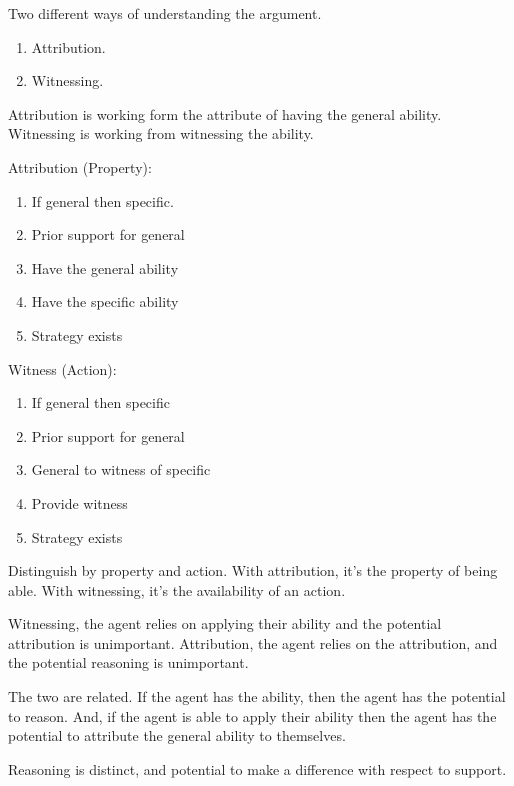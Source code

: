 \documentclass[10pt]{article}
\begin{document}
\begin{note}
  Two different ways of understanding the argument.
  \begin{enumerate}
  \item Attribution.
  \item Witnessing.
  \end{enumerate}
  Attribution is working form the attribute of having the general ability.
  Witnessing is working from witnessing the ability.

  \begin{multicols}{2}
    Attribution (Property):
    \begin{enumerate}
    \item If general then specific.
    \item Prior support for general
    \item Have the general ability
    \item Have the specific ability
    \item Strategy exists
    \end{enumerate}

    Witness (Action):
    \begin{enumerate}
    \item If general then specific
    \item Prior support for general
    \item General to witness of specific
    \item Provide witness
    \item Strategy exists
    \end{enumerate}
  \end{multicols}

  {
    \color{red}
    Distinguish by property and action.
    With attribution, it's the property of being able.
    With witnessing, it's the availability of an action.
  }

  Witnessing, the agent relies on applying their ability and the potential attribution is unimportant.
  Attribution, the agent relies on the attribution, and the potential reasoning is unimportant.

  The two are related.
  If the agent has the ability, then the agent has the potential to reason.
  And, if the agent is able to apply their ability then the agent has the potential to attribute the general ability to themselves.

  Reasoning is distinct, and potential to make a difference with respect to support.
\end{note}
\end{document}
